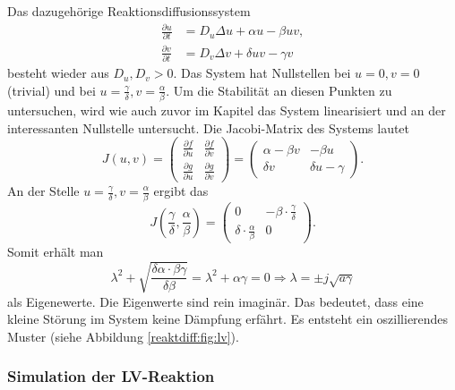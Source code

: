 Das dazugehörige Reaktionsdiffusionssystem
\begin{align*}
    \frac{\partial u}{\partial t} &= D_u \Delta u + \alpha u - \beta u v,
    \\
    \frac{\partial v}{\partial t} &= D_v \Delta v + \delta u v - \gamma v
\end{align*}
besteht wieder aus \(D_u,D_v > 0\).
Das System hat Nullstellen bei  \(u = 0,v = 0\) (trivial) und bei \(u = \frac{\gamma}{\delta}, v = \frac{\alpha}{\beta}\).
Um die Stabilität an diesen Punkten zu untersuchen, wird wie auch zuvor im Kapitel das System linearisiert und an der interessanten Nullstelle untersucht.
Die Jacobi-Matrix des Systems lautet
\begin{equation*}
        J(u,v) =
        \begin{pmatrix}
        \frac{\partial f}{\partial u} & \frac{\partial f}{\partial v} \\
        \frac{\partial g}{\partial u} & \frac{\partial g}{\partial v}
        \end{pmatrix}
        =
        \begin{pmatrix}
        \alpha - \beta v & -\beta u \\
        \delta v & \delta u - \gamma
        \end{pmatrix}.
\end{equation*}
An der Stelle \(u = \frac{\gamma}{\delta}, v = \frac{\alpha}{\beta}\) ergibt das
\begin{equation*}
         J\left(\frac{\gamma}{\delta},\frac{\alpha}{\beta}\right) =
        \begin{pmatrix}
        0 & -\beta \cdot\frac{\gamma}{\delta} \\
        \delta \cdot \frac{\alpha}{\beta} & 0
        \end{pmatrix}. 
\end{equation*}
Somit erhält man
\begin{equation*}
    \lambda^2 + \sqrt{\frac{\delta \alpha \cdot \beta \gamma}{\delta \beta}}
     = 
     \lambda^2 + \alpha \gamma = 0 
     \Rightarrow
     \lambda = \pm j \sqrt{a\gamma}
\end{equation*}
als Eigenewerte.
Die Eigenwerte sind rein imaginär.
Das bedeutet, dass eine kleine Störung im System keine Dämpfung erfährt.
Es entsteht ein oszillierendes Muster (siehe Abbildung \ref{reaktdiff:fig:lv}).

\subsubsection{Simulation der LV-Reaktion}

